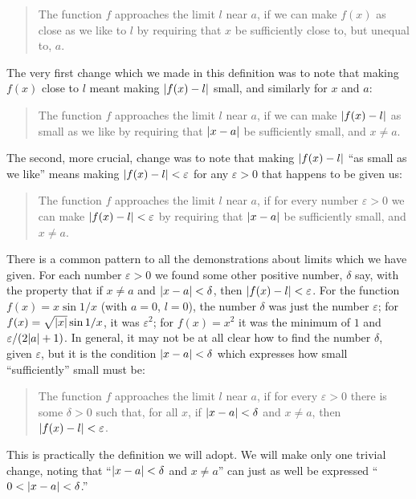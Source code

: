 \begin{quote}
The function $f$ approaches the limit $l$ near $a$, if we can make $f(x)$ as
close as we like to $l$ by requiring that $x$ be sufficiently close to, but
unequal to, $a$.
\end{quote}

The very first change which we made in this definition was to note that making
$f(x)$ close to $l$ meant making $\lvert f(x)-l\rvert$ small, and similarly for $x$
and $a$:

\begin{quote}
The function $f$ approaches the limit $l$ near $a$, if we can make
$\lvert f(x)-l\rvert$ as small as we like by requiring that $\lvert x-a\rvert$ be
sufficiently small, and $x\neq a$.
\end{quote}

The second, more crucial, change was to note that making $\lvert f(x)-l\rvert$ ``as
small as we like'' means making $\lvert f(x)-l\rvert<\varepsilon$ for any
$\varepsilon>0$ that happens to be given us:

\begin{quote}
The function $f$ approaches the limit $l$ near $a$, if for every number
$\varepsilon>0$ we can make $\lvert f(x)-l\rvert<\varepsilon$ by requiring that
$\lvert x-a\rvert$ be sufficiently small, and $x\neq a$.
\end{quote}

There is a common pattern to all the demonstrations about limits which we have
given. For each number $\varepsilon>0$ we found some other positive number,
$\delta$ say, with the property that if $x\neq a$ and $\lvert x-a\rvert<\delta$, then
$\lvert f(x)-l\rvert<\varepsilon$. For the function $f(x)=x\sin 1/x$ (with $a=0$,
$l=0$), the number $\delta$ was just the number $\varepsilon$; for
$f(x)=\sqrt{\lvert x\rvert}\sin 1/x$, it was $\varepsilon^2$; for $f(x)=x^2$ it was
the minimum of $1$ and $\varepsilon/(2\lvert a\rvert+1)$. In general, it may not be
at all clear how to find the number $\delta$, given $\varepsilon$, but it is
the condition $\lvert x-a\rvert<\delta$ which expresses how small ``sufficiently''
small must be:

\begin{quote}
The function $f$ approaches the limit $l$ near $a$, if for every
$\varepsilon>0$ there is some $\delta>0$ such that, for all $x$, if
$\lvert x-a\rvert<\delta$ and $x\neq a$, then $\lvert f(x)-l\rvert<\varepsilon$.
\end{quote}

This is practically the definition we will adopt. We will make only one
trivial change, noting that ``$\lvert x-a\rvert<\delta$ and $x\neq a$'' can just as
well be expressed ``$0<\lvert x-a\rvert<\delta$.''

